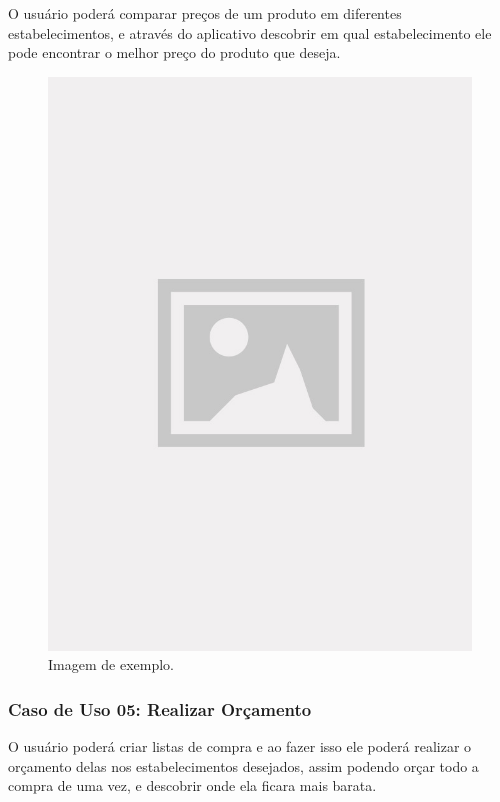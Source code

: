 O usuário poderá comparar preços de um produto em diferentes estabelecimentos, e através do aplicativo descobrir em qual estabelecimento ele pode encontrar o melhor preço do produto que deseja.

\begin{figure}[!htb]
\centering
\caption{Imagem de exemplo.}
\includegraphics[width=\linewidth]{figuras/placeholder.jpg}
\end{figure}

\subsubsection{Caso de Uso 05: Realizar Orçamento}

O usuário poderá criar listas de compra e ao fazer isso ele poderá realizar o orçamento delas nos estabelecimentos desejados, assim podendo orçar todo a compra de uma vez, e descobrir onde ela ficara mais barata.

